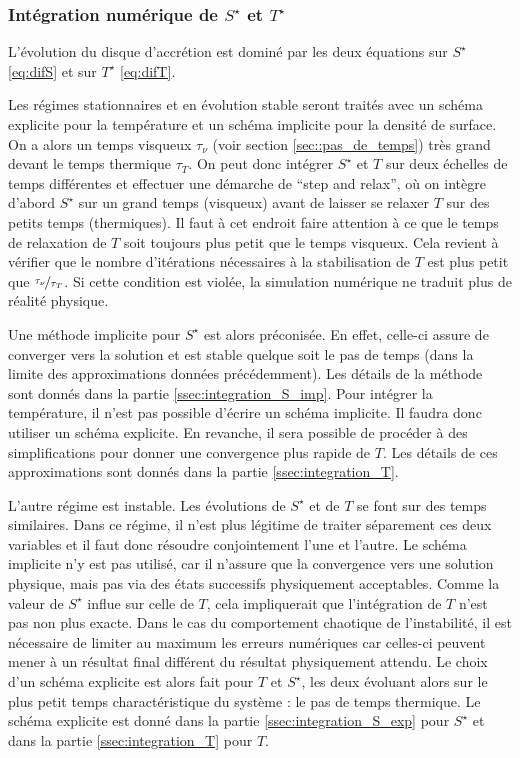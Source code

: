 \subsubsection{Intégration numérique de $S^\star$ et $T^\star$}

L'évolution du disque d'accrétion est dominé par les deux équations sur
$S^\star$ \eqref{eq:difS} et sur $T^\star$ \eqref{eq:difT}.

Les régimes stationnaires et en évolution stable seront traités avec un schéma
explicite pour la température et un schéma implicite pour la densité de
surface. On a alors un temps visqueux $\tau_\nu$ (voir section \ref{sec::pas_de_temps}) très grand devant le temps
thermique $\tau_T$. On peut donc intégrer $S^\star$ et $T$ sur deux échelles de
temps différentes et effectuer une démarche de ``step and relax'', où on
intègre d'abord $S^\star$ sur un grand temps (visqueux) avant de laisser se
relaxer $T$ sur des petits temps (thermiques). Il faut à cet endroit faire
attention à ce que le temps de relaxation de $T$ soit toujours plus petit que
le temps visqueux. Cela revient à vérifier que le nombre d'itérations
nécessaires à la stabilisation de $T$ est plus petit que
$\nicefrac{\tau_\nu}{\tau_T}$. Si cette condition est violée, la simulation
numérique ne traduit plus de réalité physique. 

Une méthode implicite pour $S^\star$ est alors préconisée. En effet, celle-ci
assure de converger vers la solution et est stable quelque soit le pas de temps
(dans la limite des approximations données précédemment). Les détails de la
méthode sont donnés dans la partie \ref{ssec:integration_S_imp}. Pour intégrer
la température, il n'est pas possible d'écrire un schéma implicite. Il faudra
donc utiliser un schéma explicite. En revanche, il sera possible de procéder à
des simplifications pour donner une convergence plus rapide de $T$. Les détails
de ces approximations sont donnés dans la partie \ref{ssec:integration_T}.

L'autre régime est instable. Les évolutions de $S^\star$ et de $T$ se font sur
des temps similaires. Dans ce régime, il n'est plus légitime de traiter
séparement ces deux variables et il faut donc résoudre conjointement l'une et
l'autre. Le schéma implicite n'y est pas utilisé, car il n'assure que la
convergence vers une solution physique, mais pas via des états successifs
physiquement acceptables. Comme la valeur de $S^\star$ influe sur celle de $T$,
cela impliquerait que l'intégration de $T$ n'est pas non plus exacte. Dans le
cas du comportement chaotique de l'instabilité, il est nécessaire de limiter au
maximum les erreurs numériques car celles-ci peuvent mener à un résultat final
différent du résultat physiquement attendu. Le choix d'un schéma explicite est
alors fait pour $T$ et $S^\star$, les deux évoluant alors sur le plus petit
temps charactéristique du système : le pas de temps thermique. Le schéma
explicite est donné dans la partie \ref{ssec:integration_S_exp} pour $S^\star$
et dans la partie \ref{ssec:integration_T} pour $T$.

